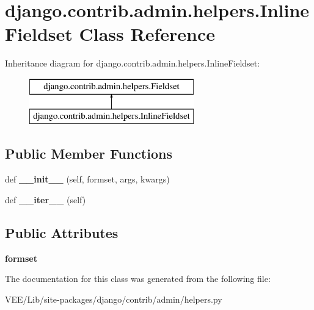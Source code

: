 \hypertarget{classdjango_1_1contrib_1_1admin_1_1helpers_1_1_inline_fieldset}{}\section{django.\+contrib.\+admin.\+helpers.\+Inline\+Fieldset Class Reference}
\label{classdjango_1_1contrib_1_1admin_1_1helpers_1_1_inline_fieldset}
Inheritance diagram for django.\+contrib.\+admin.\+helpers.\+Inline\+Fieldset\+:\begin{figure}[H]
\begin{center}
\leavevmode
\includegraphics[height=2.000000cm]{classdjango_1_1contrib_1_1admin_1_1helpers_1_1_inline_fieldset}
\end{center}
\end{figure}
\subsection*{Public Member Functions}
\begin{DoxyCompactItemize}
\item 
\mbox{\label{classdjango_1_1contrib_1_1admin_1_1helpers_1_1_inline_fieldset_a8fbe6447f5b128d507e43bd72d467a8d}} 
def {\bfseries \+\_\+\+\_\+init\+\_\+\+\_\+} (self, formset, args, kwargs)
\item 
\mbox{\label{classdjango_1_1contrib_1_1admin_1_1helpers_1_1_inline_fieldset_aafd18a1e7ea1406e161f769898d97539}} 
def {\bfseries \+\_\+\+\_\+iter\+\_\+\+\_\+} (self)
\end{DoxyCompactItemize}
\subsection*{Public Attributes}
\begin{DoxyCompactItemize}
\item 
\mbox{\label{classdjango_1_1contrib_1_1admin_1_1helpers_1_1_inline_fieldset_ab86ab1519437db5df8b0dceaa4fb84fb}} 
{\bfseries formset}
\end{DoxyCompactItemize}


The documentation for this class was generated from the following file\+:\begin{DoxyCompactItemize}
\item 
V\+E\+E/\+Lib/site-\/packages/django/contrib/admin/helpers.\+py\end{DoxyCompactItemize}
